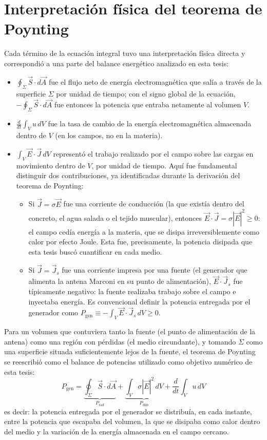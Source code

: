 \section{Interpretación física del teorema de Poynting}
Cada término de la ecuación integral tuvo una interpretación física directa y correspondió a una parte del balance energético analizado en esta tesis:
\begin{itemize}
    \item $\oint_\Sigma \vec{S}\cdot d\vec{A}$ fue el flujo neto de energía electromagnética que salía a través de la superficie $\Sigma$ por unidad de tiempo; con el signo global de la ecuación, $-\oint_\Sigma\vec{S}\cdot d\vec{A}$ fue entonces la potencia que entraba netamente al volumen $V$.
    \item $\frac{d}{dt}\int_V u\, dV$ fue la tasa de cambio de la energía electromagnética almacenada dentro de $V$ (en los campos, no en la materia).
    \item $\int_V \vec{E}\cdot\vec{J}\, dV$ representó el trabajo realizado por el campo sobre las cargas en movimiento dentro de $V$, por unidad de tiempo. Aquí fue fundamental distinguir dos contribuciones, ya identificadas durante la derivación del teorema de Poynting:
    \begin{itemize}
        \item Si $\vec{J}=\sigma\vec{E}$ fue una corriente de conducción (la que existía dentro del concreto, el agua salada o el tejido muscular), entonces $\vec{E}\cdot\vec{J}=\sigma|\vec{E}|^2\geq 0$: el campo cedía energía a la materia, que se disipa irreversiblemente como calor por efecto Joule. Esta fue, precisamente, la potencia disipada que esta tesis buscó cuantificar en cada medio.
        \item Si $\vec{J}=\vec{J}_s$ fue una corriente impresa por una fuente (el generador que alimenta la antena Marconi en su punto de alimentación), $\vec{E}\cdot\vec{J}_s$ fue típicamente negativo: la fuente realizaba trabajo sobre el campo e inyectaba energía. Es convencional definir la potencia entregada por el generador como $P_{\text{gen}} \equiv -\int_V \vec{E}\cdot\vec{J}_s\, dV \geq 0$.
    \end{itemize}
\end{itemize}

Para un volumen que contuviera tanto la fuente (el punto de alimentación de la antena) como una región con pérdidas (el medio circundante), y tomando $\Sigma$ como una superficie situada suficientemente lejos de la fuente, el teorema de Poynting se reescribió como el balance de potencias utilizado como objetivo numérico de esta tesis:
\begin{equation}
    P_{\text{gen}} = \underbrace{\oint_\Sigma \vec{S}\cdot d\vec{A}}_{P_{\text{rad}}} + \underbrace{\int_V \sigma|\vec{E}|^2\, dV}_{P_{\text{diss}}} + \frac{d}{dt}\int_V u\, dV
\end{equation}
es decir: la potencia entregada por el generador se distribuía, en cada instante, entre la potencia que escapaba del volumen, la que se disipaba como calor dentro del medio y la variación de la energía almacenada en el campo cercano.

